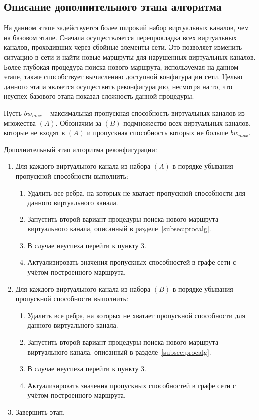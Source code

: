 \documentclass[12pt, a4paper]{article}
\begin{document}
\subsection{Описание дополнительного этапа алгоритма}
На данном этапе задействуется более широкий набор виртуальных каналов, чем на базовом этапе. Сначала осуществляется перепрокладка всех виртуальных каналов, проходивших через сбойные элементы сети. Это позволяет изменить ситуацию в сети и найти новые маршруты для нарушенных виртуальных каналов. Более глубокая процедура поиска нового маршрута, используемая на данном этапе, также способствует вычислению доступной конфигурации сети. Целью данного этапа является осуществить реконфигурацию, несмотря на то, что неуспех базового этапа показал сложность данной процедуры.

Пусть $bw_{max}$ -- максимальная пропускная способность виртуальных каналов из множества $(A)$.
Обозначим за $(B)$ подмножество всех виртуальных каналов, которые не входят в $(A)$ и пропускная способность которых не больше $bw_{max}$.

Дополнительный этап алгоритма реконфигурации:
\begin{enumerate}
	\item Для каждого виртуального канала из набора $(A)$ в порядке убывания пропускной способности выполнить:
	\begin{enumerate}
		\item Удалить все ребра, на которых не хватает пропускной способности для данного виртуального канала.
		\item Запустить второй вариант процедуры поиска нового маршрута виртуального канала, описанный в разделе~\ref{subsec:procalg}.
		\item В случае неуспеха перейти к пункту 3.
		\item Актуализировать значения пропускных способностей в графе сети с учётом построенного маршрута.
	\end{enumerate}
	\item Для каждого виртуального канала из набора $(B)$ в порядке убывания пропускной способности выполнить:
	\begin{enumerate}
		\item Удалить все ребра, на которых не хватает пропускной способности для данного виртуального канала.
		\item Запустить второй вариант процедуры поиска нового маршрута виртуального канала, описанный в разделе~\ref{subsec:procalg}.
		\item В случае неуспеха перейти к пункту 3.
		\item Актуализировать значения пропускных способностей в графе сети с учётом построенного маршрута.
	\end{enumerate}
	\item Завершить этап.
\end{enumerate}
\end{document}
